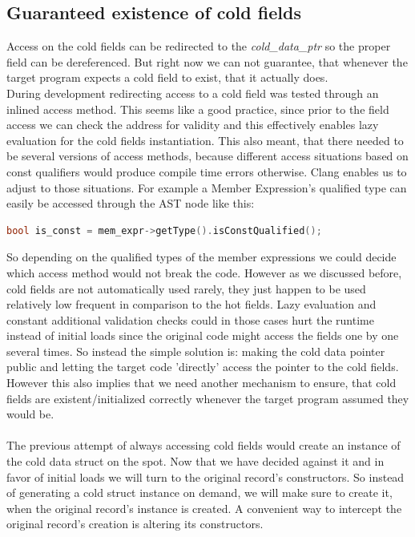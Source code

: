 \subsection{Guaranteed existence of cold fields }
Access on the cold fields can be redirected to the \textit{cold\_data\_ptr} so the proper field can be dereferenced. But right now we can not guarantee, that whenever the target program expects a cold field to exist, that it actually does.\\
During development redirecting access to a cold field was tested through an inlined access method. This seems like a good practice, since prior to the field access we can check the address for validity and this effectively enables lazy evaluation for the cold fields instantiation. This also meant, that there needed to be several versions of access methods, because different access situations based on const qualifiers would produce compile time errors otherwise. Clang enables us to adjust to those situations. For example a Member Expression's qualified type can easily be accessed through the AST node like this:
\begin{lstlisting}[language=C++, numbers=none, name={Retreiving type information from a clang::MemExpr pointer.}]
	bool is_const = mem_expr->getType().isConstQualified();
\end{lstlisting}
So depending on the qualified types of the member expressions we could decide which access method would not break the code. However as we discussed before, cold fields are not automatically used rarely, they just happen to be used relatively low frequent in comparison to the hot fields. Lazy evaluation and constant additional validation checks could in those cases hurt the runtime instead of initial loads since the original code might access the fields one by one several times. So instead the simple solution is: making the cold data pointer public and letting the target code 'directly' access the pointer to the cold fields. However this also implies that we need another mechanism to ensure, that cold fields are existent/initialized correctly whenever the target program assumed they would be.\\\\
The previous attempt of always accessing cold fields would create an instance of the cold data struct on the spot. Now that we have decided against it and in favor of initial loads we will turn to the original record's constructors. So instead of generating a cold struct instance on demand, we will make sure to create it, when the original record's instance is created. A convenient way to intercept the original record's creation is altering its constructors.\\
